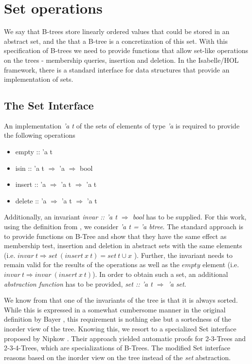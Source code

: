 \section{Set operations}

We say that B-trees store linearly ordered values
that could be stored in an abstract set,
and the that a B-tree is a concretization
of this set.
With this specification of B-trees we need to provide functions that allow
set-like operations on the trees -
membership queries, insertion and deletion.
In the Isabelle/HOL framework, there is a standard interface
for data structures that provide an implementation of sets.

\subsection{The Set Interface}

An implementation \textit{'a t} of the sets of elements of type \textit{'a} is required to provide the following
operations

\begin{itemize}
    \itshape
    \item empty :: 'a t
    \item isin :: 'a t $\Rightarrow$ 'a $\Rightarrow$ bool
    \item insert :: 'a $\Rightarrow$ 'a t $\Rightarrow$ 'a t
    \item delete :: 'a $\Rightarrow$ 'a t $\Rightarrow$ 'a t
\end{itemize}

Additionally, an invariant \textit{invar :: 'a t $\Rightarrow$ bool} has to be supplied.
For this work, using the definition from ,
we consider \textit{'a t = 'a btree}.
The standard approach is to provide functions on B-Tree and show
that they have the same effect as membership test, insertion and deletion 
in abstract sets with the same elements
(i.e. $invar\ t \Longrightarrow set\ (insert\ x\ t) = set\ t \cup {x}$ ).
Further, the invariant needs to remain valid for the results of the operations
as well as the $empty$ element (i.e. $invar\ t \Longrightarrow invar\ (insert\ x\ t)$).
In order to obtain such a set, an additional \textit{abstraction function}
has to be provided, \textit{set :: 'a t $\Rightarrow$ 'a set}.

We know from  that one of the invariants
of the tree is that it is always sorted.
While this is expressed in a somewhat cumbersome manner
in the original definition by Bayer \parencite{DBLP:journals/acta/BayerM72},
this requirement is nothing else but a sortedness of the inorder view of the tree.
Knowing this, we resort to a specialized Set interface
proposed by Nipkow \parencite{DBLP:conf/itp/Nipkow16}.
Their approach yielded automatic proofs for 2-3-Trees
and 2-3-4-Trees, which are specializations of B-Trees.
The modified Set interface reasons based on the inorder
view on the tree instead of the \textit{set} abstraction.

